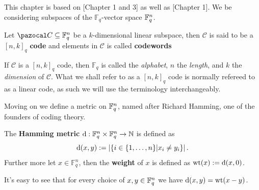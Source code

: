 This chapter is based on \cite{huffman}[Chapter 1 and 3] as well as \cite{alg_geom_codes}[Chapter 1]. We be considering subspaces of the $\mathbb{F}_q$-vector space $\mathbb{F}_{q}^{n}$.
\begin{definition}
  Let $\C \subseteq \F^{n}_{q}$ be a $k$-dimensional linear subspace, then $\mathcal{C}$ is said to be a $[n, k]_{q}$ \textbf{code} and elements in $\mathcal{C}$ is called \textbf{codewords}
\end{definition}
If $\mathcal{C}$ is a $[n, k]_{q}$ code, then $\mathbb{F}_{q}$ is called the  \textit{alphabet}, $n$ the \textit{length}, and $k$ the \textit{dimension} of $\mathcal{C}$. What we shall refer to as a $[n, k]_{q}$ code is normally refereed to as a linear code, as such we will use the terminology interchangeably.

Moving on we define a metric on $\mathbb{F}_{q}^{n}$, named after Richard Hamming, one of the founders of coding theory.
\begin{definition}
 The \textbf{Hamming metric} $\mathrm{d}: \mathbb{F}_{q}^{n} \times \mathbb{F}_{q}^{n} \to \mathbb{N}$ is defined as
  \begin{equation*}
    \mathrm{d}(x, y) := \left\lvert\left\{i \in \{1, \ldots, n\}  \middle| x_i \neq y_{i}\right\}\right\rvert.
  \end{equation*}
  Further more let $x \in \mathbb{F}_q^{n}$, then the \textbf{weight} of $x$ is defined as $\mathrm{wt}(x) := \mathrm{d}(x, 0)$.
\end{definition}
\begin{remark}
  It's easy to see that for every choice of $x, y \in \mathbb{F}_{q}^{n}$ we have $\mathrm{d}(x, y) = \mathrm{wt}(x - y)$.
\end{remark}

